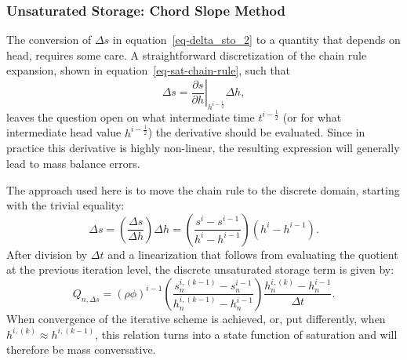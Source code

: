 \documentclass[fleqn]{article}
\begin{document}
\subsubsection*{Unsaturated Storage: Chord Slope Method}
The conversion of $\Delta s$ in equation~\ref{eq-delta_sto_2} to a
quantity that depends on head, requires some care. A straightforward
discretization of the chain rule expansion, shown in 
equation~\ref{eq-sat-chain-rule}, such that
\begin{equation}
  \Delta s = \left.\frac{\partial s}
             {\partial h}\right|_{h^{i-\frac{1}{2}}} \Delta h,
\end{equation}
leaves the question open on what intermediate time $t^{i-\frac{1}{2}}$
(or for what intermediate head value $h^{i-\frac{1}{2}}$)
the derivative should be evaluated. Since in practice this derivative
is highly non-linear, the resulting expression will generally 
lead to mass balance errors.

The approach used here is to move the chain rule to the
discrete domain, starting with the trivial equality:
\begin{equation}
  \Delta s = \left( \frac{\Delta s}{\Delta h} \right) \Delta h
           = \left( \frac{s^i - s^{i-1}}{h^i - h^{i-1}} \right) 
             \left( h^i - h^{i-1} \right).
\end{equation}
After division by $\Delta t$ and a linearization that follows
from evaluating the quotient at the previous iteration level,
the discrete unsaturated storage term is given by:
\begin{equation}
  Q_{n,\Delta s} = (\rho \phi)^{i-1}
  \left( \frac{s_n^{i,(k-1)} - s_n^{i-1}}
              {h_n^{i,(k-1)} - h_n^{i-1}} \right)
  \frac{h_n^{i,(k)} - h_n^{i-1}}{\Delta t}.
\end{equation}
When convergence of the iterative scheme is achieved, or, put
differently, when $h^{i,(k)} \approx h^{i,(k-1)}$,
this relation turns into a state function of saturation
and will therefore be mass conversative.
\end{document}
